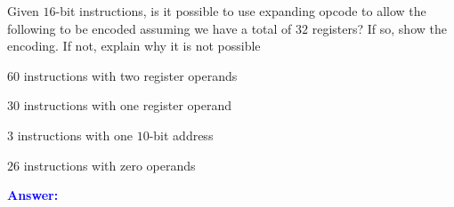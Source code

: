 \item{}
Given $16$-bit instructions, is it possible to use expanding opcode to allow the
following to be encoded assuming we have a total of $32$ registers? If so, show
the encoding. If not, explain why it is not possible
\begin{list}{\textbf{)}}{}
    \item $60$ instructions with two register operands
    \item $30$ instructions with one register operand
    \item $3$ instructions with one $10$-bit address
    \item $26$ instructions with zero operands
\end{list}
\vskip12pt
\ifanswers
\textcolor{blue}{
\textbf{Answer:}\\
}
\newpage
\fi
